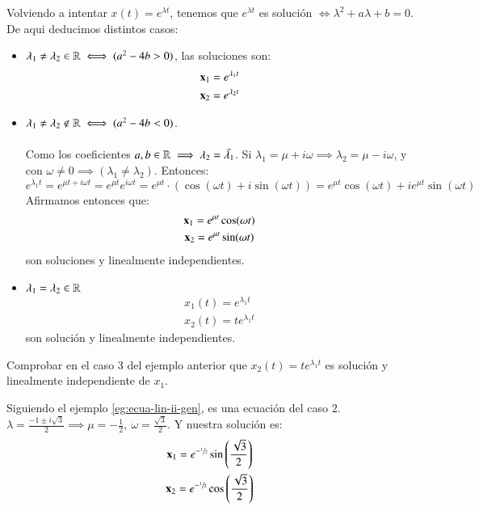 \begin{eg}[Ecuación lineal de orden 2: $\mbf{x}'' + a\mbf{x}' + b\mbf{x} = 0$]\label{eg:ecua-lin-ii-gen}
    Volviendo a intentar $x(t) = e^{\lambda t}$, tenemos que $e^{\lambda t}$ es solución $\iff \lambda^2+a\lambda+b=0$. De aqui deducimos distintos casos:
        \begin{itemize}
            \item $\lambda_1 \neq \lambda_2 \in \mathbb{R} \iff (a^2 - 4b > 0)$, las soluciones son:
            \begin{gather*}
                \mathbf{x}_1 = e^{\lambda_1 t} \\ \mathbf{x}_2 = e^{\lambda_2 t}
            \end{gather*}
            \item $\lambda_1 \neq \lambda_2 \not\in \mathbb{R} \iff (a^2 - 4b < 0)$.\\\\
            Como los coeficientes $a,b \in \mathbb{R} \implies \lambda_2 = \bar{\lambda_1}$. Si $\lambda_1 = \mu + i \omega \implies \lambda_2 = \mu - i \omega$, y con $\omega \neq 0 \implies (\lambda_1 \neq \lambda_2)$. Entonces:
            $$
                e^{\lambda_1 t} = e^{\mu t + i \omega t} = e^{\mu t} e^{i\omega t} = e^{\mu t} \cdot (\cos(\omega t) + i\sin(\omega t)) = e^{\mu t} \cos(\omega t) + i e^{\mu t} \sin (\omega t)
            $$
            Afirmamos entonces que:
            \begin{gather*}
                \mathbf{x}_1 = e^{\mu t} \cos(\omega t) \\ \mathbf{x}_2 = e^{\mu t} \sin(\omega t)
            \end{gather*}
            son soluciones y linealmente independientes.
            \item $\lambda_1 = \lambda_2 \in \mathbb{R}$
            \begin{gather*}
                x_1(t) = e^{\lambda_1 t} \\ x_2(t) = t e^{\lambda_1 t}
            \end{gather*} son solución y linealmente independientes.
        \end{itemize}
\end{eg}

\begin{th_ex}
    Comprobar en el caso 3 del ejemplo anterior que $x_2(t) = t e^{\lambda_1 t}$ es solución y linealmente independiente de $x_1$.
\end{th_ex}

\begin{eg}[Ecuación lineal de orden 2: $ \mbf{x}'' + \mbf{x}' + \mbf{x} = 0 $]
    Siguiendo el ejemplo \ref{eg:ecua-lin-ii-gen}, es una ecuación del caso 2. $\lambda = \frac{-1 \pm i\sqrt{3}}{2} \implies \mu = -\frac{1}{2},\ \omega = \frac{\sqrt{3}}{2}$. Y nuestra solución es:
    \begin{gather*}
        \mathbf{x}_1 = e^{-\sfrac{1}{2}} \sin\left(\frac{\sqrt{3}}{2}\right) \\ \mathbf{x}_2 = e^{-\sfrac{1}{2}} \cos\left(\frac{\sqrt{3}}{2}\right)
    \end{gather*}
\end{eg}

